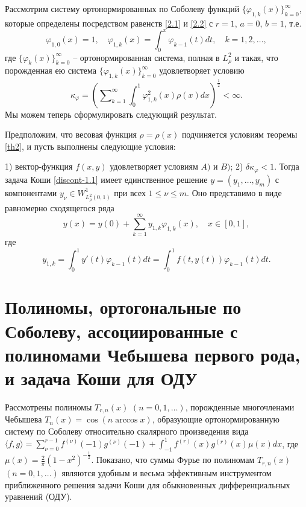 Рассмотрим систему ортонормированных по Соболеву функций $\{\varphi_{1,k}(x)\}_{k=0}^\infty$, которые определены  посредством равенств \eqref{2.1} и \eqref{2.2} с $r=1$, $a=0$, $b=1$,  т.е.
\begin{equation}\label{discont-3.2}
\varphi_{1,0}(x)=1, \quad \varphi_{1,k}(x)= \int_0^x\varphi_{k-1}(t)dt,\quad k=1,2,\ldots,
\end{equation}
где $\{\varphi_{k}(x)\}_{k=0}^\infty$ -- ортонормированная система, полная в $L_{\rho}^2$ и такая, что порожденная ею система $\{\varphi_{1,k}(x)\}_{k=0}^\infty$ удовлетворяет  условию
\begin{equation}\label{discont-3.3}
\kappa_\varphi=\left(\sum\nolimits_{k=1}^\infty \int_0^1\varphi^2_{1,k}(x)\rho(x)dx\right)^\frac12<\infty.
\end{equation}
Мы можем   теперь сформулировать следующий результат.
\begin{theorem}\label{discont-th3.3}
	Предположим, что весовая функция $\rho = \rho(x)$ подчиняется условиям теоремы \ref{th2}, и пусть выполнены следующие условия:
	
	1) вектор-функция $f(x,y)$ удовлетворяет условиям $A)$ и $B)$;
	2) $\delta\kappa_\varphi<1$.
	Тогда задача Коши \eqref{discont-1.1} имеет  единственное решение $y=(y_1,\ldots,y_m)$ с компонентами $y_\nu\in W^1_{L^2_\rho(0,1)}$ при всех $1\le\nu\le m$. Оно
	представимо в виде равномерно сходящегося ряда
	\begin{equation}\label{discont-3.4}
	y(x)=y(0)+\sum_{k=1}^\infty y_{1,k} \varphi_{1,k}(x), \quad x\in[0,1],
	\end{equation}
	где
	$$
	y_{1,k}=\int_{0}^{1} y'(t)\varphi_{k-1}(t)dt=\int_{0}^{1} f(t,y(t))\varphi_{k-1}(t)dt.
	$$
\end{theorem}

\chapter{Полиномы, ортогональные по Соболеву, ассоциированные с полиномами Чебышева первого рода, и задача Коши для ОДУ}

Рассмотрены полиномы $T_{r,n}(x)$ $(n=0,1,\ldots)$, порожденные многочленами Чебышева $T_{n}(x)=\cos( n\arccos x)$, образующие ортонормированную систему по Соболеву относительно скалярного произведения
вида $\langle f,g\rangle=\sum_{\nu=0}^{r-1}f^{(\nu)}(-1)g^{(\nu)}(-1)+\int_{-1}^{1}f^{(r)}(x)g^{(r)}(x)\mu(x)dx$,
где $\mu(x)=\frac2\pi(1-x^2)^{-\frac12}$. Показано, что суммы Фурье по полиномам $T_{r,n}(x)$ $(n=0,1,\ldots)$ являются удобным и весьма эффективным инструментом приближенного решения задачи Коши для обыкновенных дифференциальных уравнений (ОДУ).


